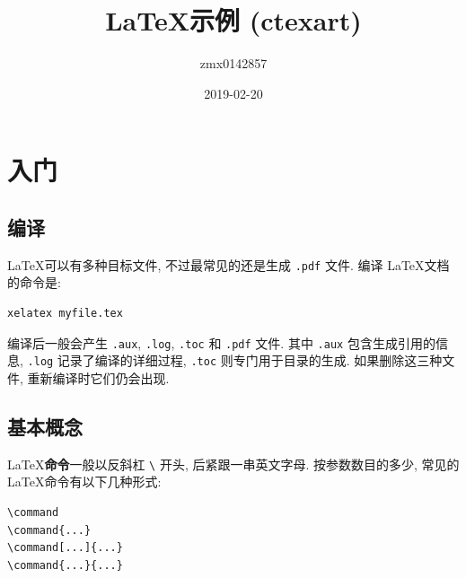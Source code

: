 \documentclass[a4paper,hyperref]{ctexart}
\title{\LaTeX 示例 (ctexart)}	%
\date{2019-02-20}				%
\author{zmx0142857}				%
\begin{document}
\maketitle				%
\newpage				%

\clearpage
\phantom{你看不到我}	%
\thispagestyle{empty}
\newpage

\setcounter{tocdepth}{2}%
\tableofcontents		%
\newpage



\section{入门}
\subsection{编译}

\LaTeX 可以有多种目标文件, 不过最常见的还是生成 \texttt{.pdf} 文件.
编译 \LaTeX 文档的命令是:

\begin{verbatim}
xelatex myfile.tex
\end{verbatim}

编译后一般会产生 \texttt{.aux}, \texttt{.log}, \texttt{.toc} 和
\texttt{.pdf} 文件.  其中 \texttt{.aux} 包含生成引用的信息, \texttt{.log}
记录了编译的详细过程, \texttt{.toc} 则专门用于目录的生成.
如果删除这三种文件, 重新编译时它们仍会出现.

\subsection{基本概念}

\LaTeX \textbf{命令}一般以反斜杠 \verb|\| 开头, 后紧跟一串英文字母.
按参数数目的多少, 常见的 \LaTeX 命令有以下几种形式:

\begin{verbatim}
\command
\command{...}
\command[...]{...}
\command{...}{...}
\end{verbatim}
\end{document}
